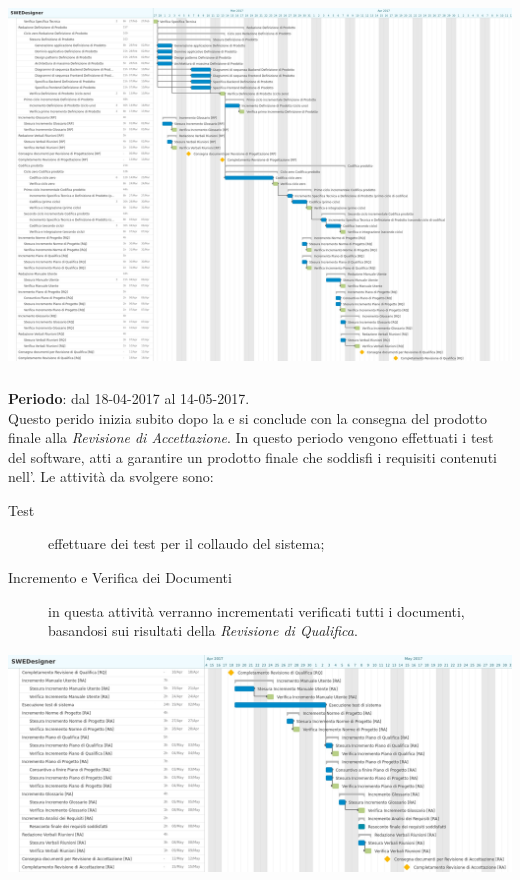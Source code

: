 {\includegraphics[width=15cm]{img/ganttpdc.png}\par}

	\subsubsection{\VV} \label{sec:VV}

	\textbf{Periodo}: dal 18-04-2017 al 14-05-2017.
	\\ Questo perido inizia subito dopo la \PDC{} e si conclude con la consegna del prodotto finale alla \emph{Revisione di Accettazione}. In questo periodo vengono effettuati i test del software, atti a garantire un prodotto finale che soddisfi i requisiti contenuti nell'\AR. Le attività da svolgere sono:
	\begin{description}
		\item[Test] effettuare dei test per il collaudo del sistema;
		\item[Incremento e Verifica dei Documenti] in questa attività verranno incrementati verificati tutti i documenti, basandosi sui risultati della \emph{Revisione di Qualifica}.
	\end{description}	
	
{\includegraphics[width=15cm]{img/ganttva.png}\par}

